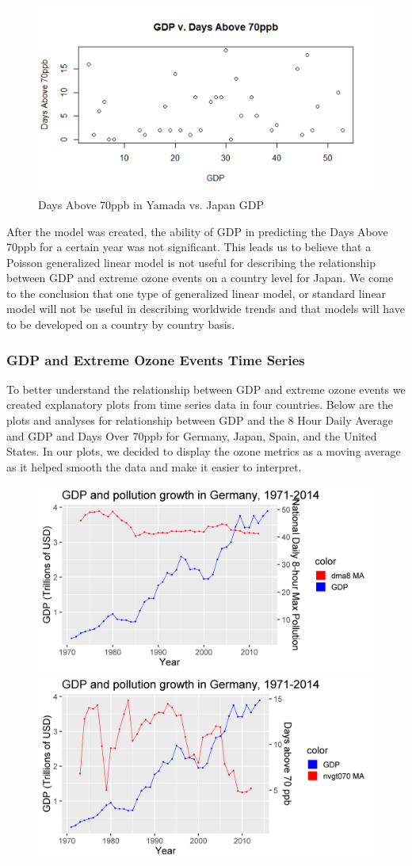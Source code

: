 \documentclass[11pt, oneside]{article}
\theoremstyle{definition}
\begin{document}
\begin{figure}[ht]
    \centering
    \includegraphics[width=0.7\linewidth]{plots/gdp_vs_days_above_70ppb.png}
    \caption{Days Above 70ppb in Yamada vs. Japan GDP}
    \label{fig:na}
\end{figure}

After the model was created, the ability of GDP in predicting the Days Above 70ppb for a certain year was not significant. This leads us to believe that a Poisson generalized linear model is not useful for describing the relationship between GDP and extreme ozone events on a country level for Japan.
We come to the conclusion that one type of generalized linear model, or standard linear model will not be useful in describing worldwide trends and that models will have to be developed on a country by country basis. 


\subsubsection{GDP and Extreme Ozone Events Time Series} %
To better understand the relationship between GDP and extreme ozone events we created explanatory plots from time series data in four countries. Below are the plots and analyses for relationship between GDP and the 8 Hour Daily Average and GDP and Days Over 70ppb for Germany, Japan, Spain, and the United States. In our plots, we decided to display the ozone metrics as a moving average as it helped smooth the data and make it easier to interpret.

\newpage

\begin{figure}[ht]
    \centering
    \includegraphics[width=0.45\linewidth]{plots/country_pollution/Germany_dma8.png}
    \includegraphics[width=0.45\linewidth]{plots/country_pollution/Germany_nvgt.png}
    \label{fig:GER}
\end{figure}
\end{document}
